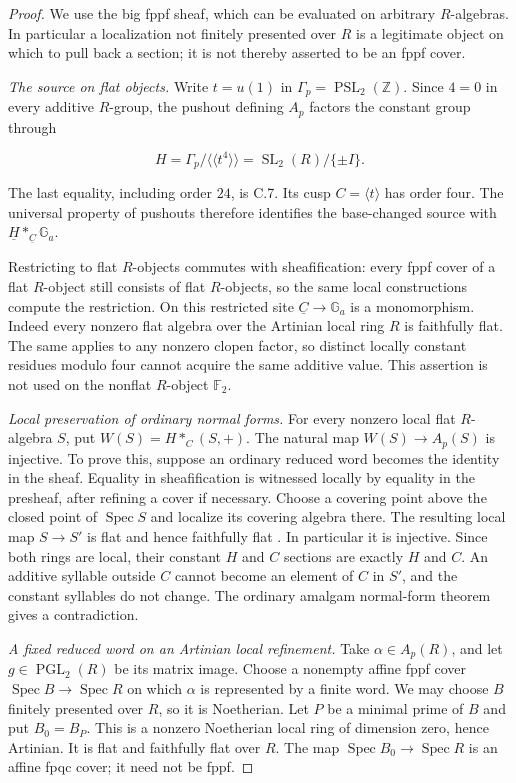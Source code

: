 \begin{proof}
We use the big fppf sheaf, which can be evaluated on arbitrary
$R$-algebras. In particular a localization not finitely presented
over $R$ is a legitimate object on which to pull back a section;
it is not thereby asserted to be an fppf cover.

\emph{The source on flat objects.}
Write $t=u(1)$ in
$\Gamma_p=\operatorname{PSL}_2(\mathbb Z)$.
Since $4=0$ in every additive $R$-group, the pushout defining $A_p$
factors the constant group through

$$
H=\Gamma_p/\langle\!\langle t^4\rangle\!\rangle
  =\operatorname{SL}_2(R)/\{\pm I\}.
$$

The last equality, including order $24$, is C.7. Its cusp
$C=\langle t\rangle$ has order four. The universal property of
pushouts therefore identifies the base-changed source with
$\underline H*_{\underline C}\mathbb G_a$.

Restricting to flat $R$-objects commutes with sheafification:
every fppf cover of a flat $R$-object still consists of flat
$R$-objects, so the same local constructions compute the restriction.
On this restricted site $\underline C\to\mathbb G_a$ is a
monomorphism. Indeed every nonzero flat algebra over the Artinian
local ring $R$ is faithfully flat. The same applies to any nonzero
clopen factor, so distinct locally constant residues modulo four
cannot acquire the same additive value. This assertion is not used
on the nonflat $R$-object $\mathbb F_2$.

\emph{Local preservation of ordinary normal forms.}
For every nonzero local flat $R$-algebra $S$, put
$W(S)=H*_C(S,+)$. The natural map $W(S)\to A_p(S)$ is injective.
To prove this, suppose an ordinary reduced word becomes the identity
in the sheaf. Equality in sheafification is witnessed locally by
equality in the presheaf, after refining a cover if necessary.
Choose a covering point above the closed point of
$\operatorname{Spec}S$ and localize its covering algebra there.
The resulting local map $S\to S'$ is flat and hence faithfully flat
\citep[Lemma~10.39.17, Tag~00HR]{C_Stacks_00HR}.
In particular it is injective. Since both rings are local, their
constant $H$ and $C$ sections are exactly $H$ and $C$.
An additive syllable outside $C$ cannot become an element of $C$
in $S'$, and the constant syllables do not change. The ordinary
amalgam normal-form theorem gives a contradiction.

\emph{A fixed reduced word on an Artinian local refinement.}
Take $\alpha\in A_p(R)$, and let
$g\in\operatorname{PGL}_2(R)$ be its matrix image.
Choose a nonempty affine fppf cover
$\operatorname{Spec}B\to\operatorname{Spec}R$ on which $\alpha$
is represented by a finite word. We may choose $B$ finitely
presented over $R$, so it is Noetherian. Let $P$ be a minimal prime
of $B$ and put $B_0=B_P$. This is a nonzero Noetherian local ring
of dimension zero, hence Artinian. It is flat and faithfully flat
over $R$. The map
$\operatorname{Spec}B_0\to\operatorname{Spec}R$
is an affine fpqc cover; it need not be fppf.


\end{proof}
